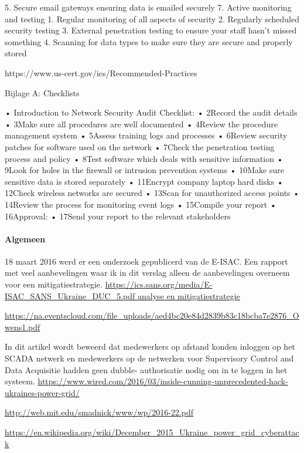 		5. Secure email gateways ensuring data is emailed securely
		7. Active monitoring and testing
		1. Regular monitoring of all aspects of security
		2. Regularly scheduled security testing
		3. External penetration testing to ensure your staff hasn’t missed something
		4. Scanning for data types to make sure they are secure and properly stored
		
		https://www.us-cert.gov/ics/Recommended-Practices
		
		Bijlage A: Checklists
		
		• Introduction to Network Security Audit Checklist:
		• 2Record the audit details
		• 3Make sure all procedures are well documented
		• 4Review the procedure management system
		• 5Assess training logs and processes
		• 6Review security patches for software used on the network
		• 7Check the penetration testing process and policy
		• 8Test software which deals with sensitive information
		• 9Look for holes in the firewall or intrusion prevention systems
		• 10Make sure sensitive data is stored separately
		• 11Encrypt company laptop hard disks
		• 12Check wireless networks are secured
		• 13Scan for unauthorized access points
		• 14Review the process for monitoring event logs
		• 15Compile your report
		• 16Approval:
		• 17Send your report to the relevant stakeholders
		
		
		
		
		\paragraph{Algemeen}
		
		
		18 maart 2016 werd er een onderzoek gepublicerd van de E-ISAC. Een rapport met veel
		aanbevelingen waar ik in dit verslag alleen de aanbevelingen overneem voor een mitigatiestrategie.
		\url{https://ics.sans.org/media/E-ISAC_SANS_Ukraine_DUC_5.pdf
			analyse en mitigatiestrategie}
		
		\url{https://na.eventscloud.com/file_uploads/aed4bc20e84d2839b83c18bcba7e2876_Owens1.pdf}
		
		In dit artikel wordt beweerd dat medewerkers op afstand konden inloggen op het SCADA netwerk en
		medewerkers op de netwerken voor Supervisory Control and Data Acquisitie hadden geen dubble-
		authorisatie nodig om in te loggen in het systeem.
		\url{https://www.wired.com/2016/03/inside-cunning-unprecedented-hack-ukraines-power-grid/}
		
		\url{	http://web.mit.edu/smadnick/www/wp/2016-22.pdf}
	
		\url{	https://en.wikipedia.org/wiki/December_2015_Ukraine_power_grid_cyberattack}
	
